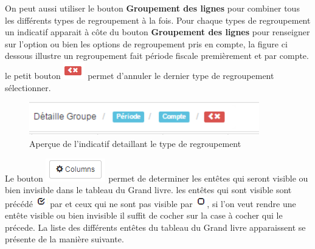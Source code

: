 \documentclass[12pt,a4paper]{report}
\begin{document}
On peut aussi utiliser le bouton \textbf{Groupement des lignes} pour combiner tous les différents types de regroupement à la fois. Pour chaque types de regroupement un indicatif apparait à côte du bouton \textbf{Groupement des lignes} pour renseigner sur l'option ou bien les options de regroupement pris en compte, la figure ci dessous illustre un regroupement fait période fiscale premièrement et par compte. le petit bouton \includegraphics[scale=0.7]{pic/RedBack.png} permet d'annuler le dernier type de regroupement sélectionner. 

\begin{figure}[h]
\begin{center}
\includegraphics[width=10cm]{pic/DetailleGroupeOption.png}
\end{center}
\caption{Aperçue de l'indicatif detaillant le type de regroupement}
\label{Aperçue de l'indicatif detaillant le type de regroupement}
\end{figure}



Le bouton  \includegraphics[scale=0.7]{pic/ColumnsLedger.png} permet de determiner les entêtes qui seront visible ou bien invisible dans le tableau du Grand livre. les entêtes qui sont visible sont précédé \includegraphics[scale=0.7]{pic/Checked.png} par et ceux qui ne sont pas visible par \includegraphics[scale=0.7]{pic/Unchecked.png}, si l'on veut rendre une entête visible ou bien invisible il suffit de cocher sur la case à cocher qui le précede. La liste des différents entêtes du tableau du Grand livre apparaissent se présente de la manière suivante.
\end{document}
